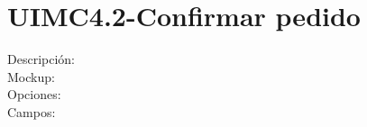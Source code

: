 
\section{UIMC4.2-Confirmar pedido}
\begin{description}
	\item[Descripción:]
	
	\item[Mockup:]\hspace{1pt}
	
	\item[Opciones:]
	
	\item[Campos:]

\end{description}
